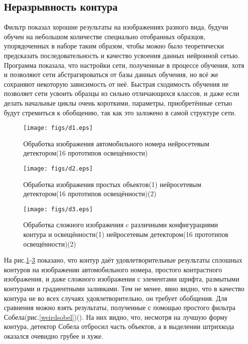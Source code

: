 \documentclass[a4paper,12pt]{report}
\begin{document}
\subsection{Неразрывность контура}
Фильтр показал хорошие результаты на изображениях разного вида, будучи обучен на небольшом количестве специально отобранных образцов, упорядоченных в наборе таким образом, чтобы можно было теоретически предсказать последовательность и качество усвоения данных нейронной сетью. Программа показала, что настройки сети, полученные в процессе обучения, хотя и позволяют сети абстрагироваться от базы данных обучения, но всё же сохраняют некоторую зависимость от неё. Быстрая сходимость обучения не позволяет сети усвоить образцы из сильно отличающихся классов, и даже если делать начальные циклы очень короткими, параметры, приобретённые сетью будут стремиться к обобщению, так как это заложено в самой структуре сети.
\begin{center}
\begin{figure}[h]
\begin{center}
\texttt{[image: figs/d1.eps]}
\end{center}\caption{Обработка изображения автомобильного номера нейросетевым детектором(16 прототипов освещённости)}
\label{numsimple}
\end{figure}
\end{center}
\begin{center}
\begin{figure}[h]
\begin{center}
\texttt{[image: figs/d2.eps]}
\end{center}\caption{Обработка изображения простых объектов(1) нейросетевым детектором(16 прототипов освещённости)(2)}
\label{simplesimple}
\end{figure}
\end{center}
\begin{center}
\begin{figure}[h]
\begin{center}
\texttt{[image: figs/d3.eps]}
\end{center}\caption{Обработка сложного изображения c различными конфигурациями контура и освещённости(1) нейросетевым детектором(16 прототипов освещённости)(2)}
\label{weird}
\end{figure}
\end{center}
На рис.\ref{numsimple}-\ref{weird} показано, что контур даёт удовлетворительные результаты сплошных контуров на изображении автомобильного номера, простого контрастного изображения, и даже сложного изображения с элементами шрифта, размытыми контурами и градиентными заливками. Тем не менее, явно видно, что в качество контура не во всех случаях удовлетворительно, он требует обобщения. Для сравнения можно взять результаты, полученные с помощью простого фильтра Собела(рис.\ref{weirdsobel})(). На них видно, что, несмотря на лучшую форму контура, детектор Собела отбросил часть объектов, а в выделении штрихкода оказался очевидно грубее и хуже.
\end{document}
